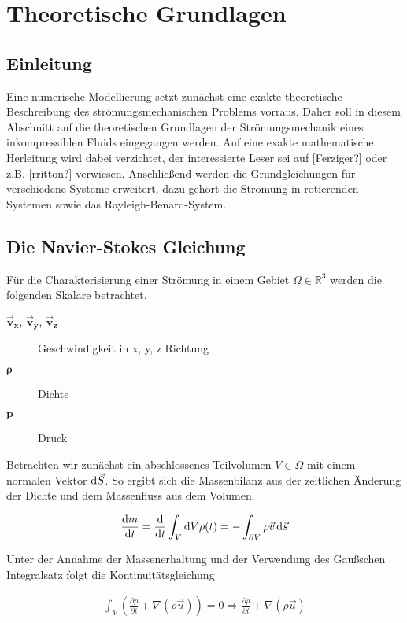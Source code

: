 \chapter{Theoretische Grundlagen}

\section{Einleitung}

Eine numerische Modellierung setzt zunächst eine exakte theoretische Beschreibung des strömungsmechanischen Problems vorraus.
Daher soll in diesem Abschnitt auf die theoretischen Grundlagen der Strömungsmechanik eines inkompressiblen Fluids eingegangen werden.
Auf eine exakte mathematische Herleitung wird dabei verzichtet, der interessierte Leser sei auf [Ferziger?] oder z.B. [rritton?] verwiesen.
Anschließend werden die Grundgleichungen für verschiedene Systeme erweitert, dazu gehört die Strömung in rotierenden Systemen sowie das Rayleigh-Benard-System.

\section{Die Navier-Stokes Gleichung}

Für die Charakterisierung einer Strömung in einem Gebiet $\Omega \in \mathbb{R}^3$ werden die folgenden Skalare betrachtet.
\begin{description}
    \item[$\bm{\vec{v}_x}$, $\bm{\vec{v}_y}$, $\bm{\vec{v}_z}$] Geschwindigkeit in x, y, z Richtung
    \item[$\bm{\rho}$] Dichte
    \item[$\bm{p}$] Druck
\end{description}

Betrachten wir zunächst ein abschlossenes Teilvolumen $V \in \Omega$ mit einem normalen Vektor $\mathop{}\!\mathrm{d} \vec{S}$.
So ergibt sich die Massenbilanz aus der zeitlichen Änderung der Dichte und dem Massenfluss aus dem Volumen.

\begin{align}
    \frac{\mathop{}\!\mathrm{d} m}{\mathop{}\!\mathrm{d} t} &= \frac{\mathop{}\!\mathrm{d}}{\mathop{}\!\mathrm{d} t} \int_{V}\mathop{}\!\mathrm{d} V \rho(t)  = -\int_{\partial V} \rho \vec{v}\mathop{}\!\mathrm{d} \vec{s} \\
\end{align}

Unter der Annahme der Massenerhaltung und der Verwendung des Gaußschen Integralsatz folgt
die Kontinuitätsgleichung

\begin{align}
     \int_{V} \left( \frac{\partial \rho}{\partial t}  + \nabla(\rho \vec{u}) \right) = 0 \Rightarrow \frac{\partial \rho}{\partial t}  + \nabla(\rho \vec{u}) \\
\end{align}


